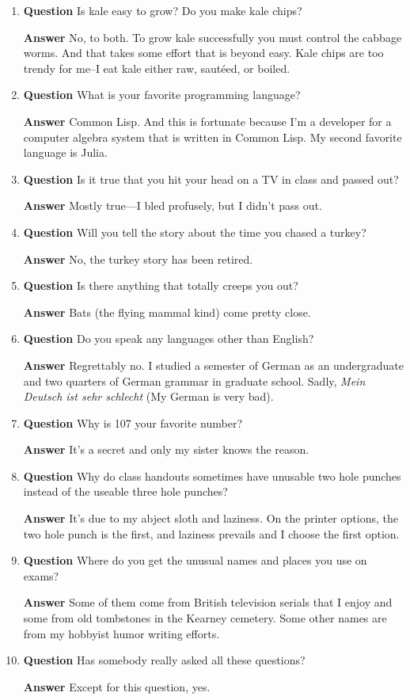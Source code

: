 \documentclass[11pt]{article}
\newcounter{ex}\setcounter{ex}{0}
\newcounter{dy}\setcounter{dy}{0}
\begin{document}
\begin{enumerate}
 \item   \textbf{Question} Is kale easy to grow? Do you make kale chips?
 
 \textbf{Answer} No, to both. To grow kale successfully  you must
 control the cabbage worms. And that takes some effort that is 
 beyond easy.  Kale chips are too trendy for me--I eat 
 kale either raw, sautéed, or boiled.

\item   \textbf{Question}  What is your favorite programming language?

 \textbf{Answer}  Common Lisp. And this is fortunate because I'm a developer for a computer algebra system that is written in Common Lisp. My second favorite language is Julia.

\item   \textbf{Question} Is it true that you hit your head on a TV in class and 
passed out?

  \textbf{Answer} Mostly true---I bled profusely, but I didn't pass out.

\item   \textbf{Question} Will you tell the story about the time you chased a turkey?

 \textbf{Answer} No, the turkey story has been retired.


\item   \textbf{Question} Is there anything that totally creeps you out?

\textbf{Answer} Bats (the flying mammal kind) come pretty close.

\item \textbf{Question} Do you speak any languages other than English?

\textbf{Answer} Regrettably no. I studied a semester of German as an 
undergraduate and two quarters of German grammar in graduate school. 
Sadly, \emph{Mein Deutsch ist sehr schlecht} (My German is very bad).

\item \textbf{Question} Why is 107 your favorite number?

 \textbf{Answer} It's a secret and only my sister knows the reason.

\item \textbf{Question} Why do class handouts sometimes have unusable 
two hole punches instead of the useable three hole punches?

\textbf{Answer} It's due to my abject sloth and laziness. 
On the printer options, the two hole punch is the first, and 
laziness prevails and I choose the first option.

\item \textbf{Question} Where do you get the unusual names and places you
use on exams?
 
\textbf{Answer} Some of them come from British television serials
that I enjoy and some from old tombstones in the Kearney cemetery.
Some other names are from my hobbyist humor writing efforts.

\item  \textbf{Question} Has somebody really asked all these questions?
 
\textbf{Answer} Except for this question, yes.
\end{enumerate}
\end{document}
